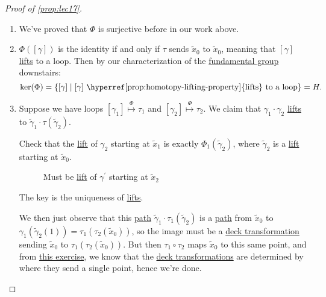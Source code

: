 \begin{proof}[Proof of \autoref{prop:lec17}]
	\begin{enumerate}
		\item We've proved that \(\Phi \) is surjective before in our work above.
		\item \(\Phi ([\gamma ])\) is the identity if and only if \(\tau \) sends \(\widetilde{x} _0\) to \(\widetilde{x} _0\), meaning that \([\gamma ]\)
		      \hyperref[prop:homotopy-lifting-property]{lifts} to a loop. Then by our characterization of the \hyperref[def:fundamental-group]{fundamental group} downstairs:
		      \[
			      \ker (\Phi ) = \left\{[\gamma ] \mid \text{\([\gamma ]\) \hyperref[prop:homotopy-lifting-property]{lifts} to a loop} \right\} = H.
		      \]
		\item Suppose we have loops \([\gamma _1]\overset{\Phi }{\mapsto } \tau _1\) and \([\gamma _2]\overset{\Phi }{\mapsto }\tau _2\). We claim that \(\gamma _1\cdot \gamma _2\)
		      \hyperref[prop:homotopy-lifting-property]{lifts} to \(\widetilde{\gamma} _1\cdot \tau (\widetilde{\gamma} _2)\).
		      \begin{figure}[H]
			      \centering
			      \label{fig:pf:prop:lec17-1}
		      \end{figure}
		      \begin{exercise}
			      Check that the \hyperref[def:lift]{lift} of \(\gamma _2\) starting at \(\widetilde{x} _1\) is exactly
			      \(\Phi _1(\widetilde{\gamma} _2)\), where \(\widetilde{\gamma} _2\) is a \hyperref[def:lift]{lift} starting at \(\widetilde{x} _0\).
			      \begin{figure}[H]
				      \centering
				      \caption{Must be \hyperref[def:lift]{lift} of \(\gamma ^\prime \) starting at \(\widetilde{x} _2\)}
				      \label{fig:pf:prop:lec17-2}
			      \end{figure}
		      \end{exercise}
		      \begin{answer}
			      The key is the uniqueness of \hyperref[prop:homotopy-lifting-property]{lifts}.
		      \end{answer}

		      We then just observe that this \hyperref[def:path]{path} \(\widetilde{\gamma} _1\cdot \tau _1(\widetilde{\gamma} _2)\) is a \hyperref[def:path]{path}
		      from \(\widetilde{x} _0\) to \(\gamma_1(\widetilde{\gamma} _2(1)) = \tau_1(\tau _2(\widetilde{x} _0))\), so the image must be a
		      \hyperref[def:deck-transformation]{deck transformation} sending \(\widetilde{x} _0\) to \(\tau _1(\tau _2(\widetilde{x} _0))\). But then \(\tau _1\circ \tau _2\)
		      maps \(\widetilde{x} _0\) to this same point, and from \hyperref[ex:lec17]{this exercise}, we know that the \hyperref[def:deck-transformation]{deck transformations}
		      are determined by where they send a single point, hence we're done.
	\end{enumerate}
\end{proof}

